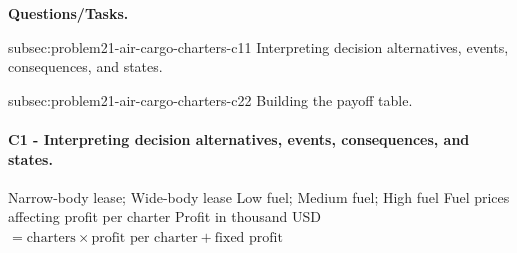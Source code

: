 	\textbf{Questions/Tasks.}
	\begin{enumerate}
		\CriterionTask
		{subsec:problem21-air-cargo-charters-c1}{1}
		{Interpreting decision alternatives, events, consequences, and states.}

		\CriterionTask
		{subsec:problem21-air-cargo-charters-c2}{2}
		{Building the payoff table.}
	\end{enumerate}

\paragraph*{C1 - Interpreting decision alternatives, events, consequences, and states.}
	\label{subsec:problem21-air-cargo-charters-c1}
	\DecisionElementsTable
	{Narrow-body lease; Wide-body lease}
	{Low fuel; Medium fuel; High fuel}
	{Fuel prices affecting profit per charter}
	{Profit in thousand USD $= \text{charters} \times \text{profit per charter} + \text{fixed profit}$}


